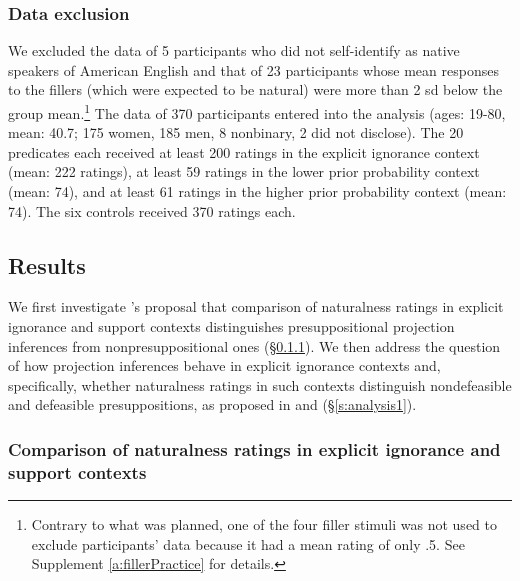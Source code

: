 \documentclass[11pt,fleqn]{article}
\newcommand{\6}{\mbox{$[\hspace*{-.6mm}[$}}
\newcommand{\9}{\mbox{$]\hspace*{-.6mm}]$}}
\newcommand{\citepos}[1]{\citeauthor{#1}'s \citeyear{#1}}
\begin{document}
\subsubsection{Data exclusion} 

We excluded the data of 5 participants who did not self-identify as native speakers of American English and that of 23 participants whose mean responses to the fillers (which were expected to be natural) were more than 2 sd below the group mean.\footnote{Contrary to what was planned, one of the four filler stimuli was not used to exclude participants' data because it had a mean rating of only .5. See Supplement \ref{a:fillerPractice} for details.} The data of 370 participants entered into the analysis (ages: 19-80, mean: 40.7; 175 women, 185 men, 8 nonbinary, 2 did not disclose). The 20 predicates each received at least 200 ratings in the explicit ignorance context (mean: 222 ratings), at least 59 ratings in the lower prior probability context (mean: 74), and at least 61 ratings in the higher prior probability context (mean: 74). The six controls received 370 ratings each. 

\subsection{Results}

We first investigate \citepos{mandelkern-etal2020} proposal that comparison of naturalness ratings in explicit ignorance and support contexts distinguishes presuppositional projection inferences from nonpresuppositional ones (\S\ref{s:analysis2}). We then address the question of how projection inferences behave in explicit ignorance contexts and, specifically, whether naturalness ratings in such contexts distinguish nondefeasible and defeasible presuppositions, as proposed in \citealt{simons01} and \citealt{abusch10} (\S\ref{s:analysis1}).

\subsubsection{Comparison of naturalness ratings in explicit ignorance and support contexts}\label{s:analysis2}
\end{document}
